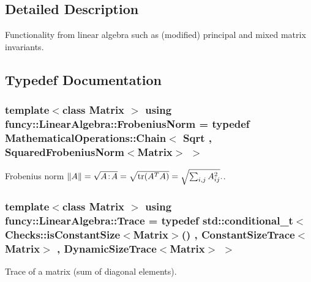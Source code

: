 \subsection{Detailed Description}
Functionality from linear algebra such as (modified) principal and mixed matrix invariants. 

\subsection{Typedef Documentation}
\hypertarget{group__LinearAlgebraGroup_ga38eae956615afce1e62bbd7c465688b4}{
\subsubsection[{Frobenius\-Norm}]{\setlength{\rightskip}{0pt plus 5cm}template$<$class Matrix $>$ using {\bf funcy\-::\-Linear\-Algebra\-::\-Frobenius\-Norm} = typedef Mathematical\-Operations\-::\-Chain$<$ Sqrt , Squared\-Frobenius\-Norm$<$Matrix$>$ $>$}}\label{group__LinearAlgebraGroup_ga38eae956615afce1e62bbd7c465688b4}


Frobenius norm $ \|A\| = \sqrt{A\negthinspace : \negthinspace A }= \sqrt{\mathrm{tr}(A^TA)} = \sqrt{\sum_{i,j} A_{ij}^2}. $. 

\hypertarget{group__LinearAlgebraGroup_ga5771b42f6ae0c554253a3602f6151b00}{
\subsubsection[{Trace}]{\setlength{\rightskip}{0pt plus 5cm}template$<$class Matrix $>$ using {\bf funcy\-::\-Linear\-Algebra\-::\-Trace} = typedef std\-::conditional\-\_\-t$<$ Checks\-::is\-Constant\-Size$<$Matrix$>$() , Constant\-Size\-Trace$<$Matrix$>$ , Dynamic\-Size\-Trace$<$Matrix$>$ $>$}}\label{group__LinearAlgebraGroup_ga5771b42f6ae0c554253a3602f6151b00}


Trace of a matrix (sum of diagonal elements). 



